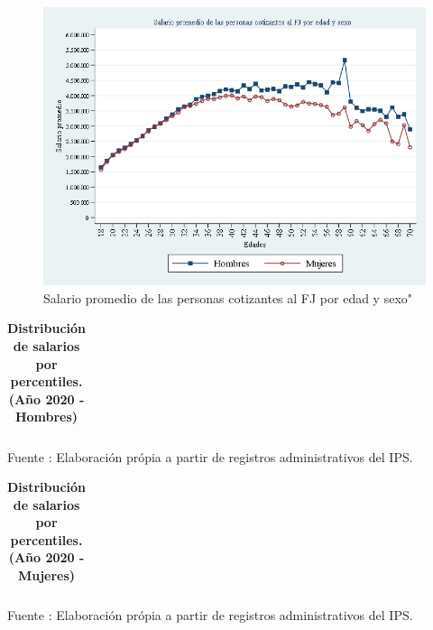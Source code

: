 \begin{figure}[H]
\begin{center}
                    \caption{Salario promedio de las personas cotizantes al FJ por edad y sexo"}
                    \vspace{0.5cm}
                    \includegraphics[scale=0.6]{RA_IPS_cotizantes_2020_sexo_edad_18a70_salprom.png}
\end{center}
\end{figure}

\begin{table}[H]
\begin{center}
\scriptsize
\caption{\bf{Distribución de salarios por percentiles. (Año 2020 - Hombres)}}
\begin{tabular}{l|rrrrrrrrrrrrr}

\end{tabular}
                    \item Fuente : Elaboración própia a partir de registros administrativos del IPS.
\end{center}
\end{table}

\begin{table}[H]
\begin{center}
\scriptsize
\caption{\bf{Distribución de salarios por percentiles. (Año 2020 - Mujeres)}}
\begin{tabular}{l|rrrrrrrrrrrrr}

\end{tabular}
                    \item Fuente : Elaboración própia a partir de registros administrativos del IPS.
\end{center}
\end{table}

